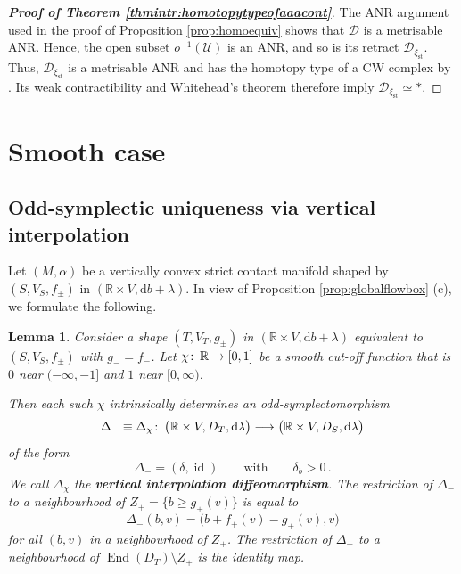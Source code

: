 \documentclass{amsart}
\newtheorem{lem}[prop]{Lemma}
\theoremstyle{definition}
\def\co{\colon\thinspace}
\newcommand{\rmd}{\mathrm d}
\newcommand{\DD}{\mathcal D}
\newcommand{\R}{\mathbb R}
\newcommand{\UU}{\mathcal U}
\newcommand{\lra}{\longrightarrow}
\newcommand{\ra}{\rightarrow}
\DeclareMathOperator{\End}{\mathrm{End}}
\DeclareMathOperator{\id}{\mathrm{id}}
\DeclareMathOperator{\st}{\mathrm{st}}
\begin{document}
\begin{proof}[{\bf Proof of Theorem
\ref{thmintr:homotopytypeofaaacont}}]
The ANR argument used in the proof of
Proposition \ref{prop:homoequiv}
shows that $\DD$ is a metrisable ANR.
Hence, the open subset $o^{-1}(\UU)$ is an ANR,
and so is its retract $\DD_{\xi_{\st}}$.
Thus, $\DD_{\xi_{\st}}$ is a metrisable ANR
and has the homotopy type of a CW complex
by \cite[Theorem~2]{mi59}.
Its weak contractibility and Whitehead's theorem
therefore imply $\DD_{\xi_{\st}}\simeq*$.
\end{proof}




\section{Smooth case}
\label{sec:smoothcase}



\subsection{Odd-symplectic uniqueness
via vertical interpolation\label{subsec:oddsympuniness}}
Let $(M,\alpha)$ be a vertically convex
strict contact manifold
shaped by $(S,V_S,f_{\pm})$
in $(\R\times V,\rmd b+\lambda)$.
In view of Proposition \ref{prop:globalflowbox} (c),
we formulate the following.


\begin{lem}
\label{lem:verticallydiffeomorphic}
Consider a shape $(T,V_T,g_{\pm})$
in $(\R\times V,\rmd b+\lambda)$
equivalent to $(S,V_S,f_{\pm})$
with $g_-=f_-$.
Let $\chi\co\R\ra[0,1]$ be a smooth cut-off function
that is $0$ near $(-\infty,-1]$ and $1$ near $[0,\infty)$.

Then each such $\chi$ intrinsically determines
an odd-symplectomorphism
\[
\Delta_-\equiv
\Delta_{\chi}
\co
\big(\R\times V,D_T,\rmd\lambda\big)
\lra
\big(\R\times V,D_S,\rmd\lambda\big)
\]
of the form
\[
\Delta_-=(\delta,\id)
\qquad\text{with}\qquad
\delta_b>0
\,.
\]
We call $\Delta_\chi$ the
{\bf vertical interpolation diffeomorphism}.
The restriction of $\Delta_-$
to a neighbourhood of $Z_+=\{b\geq g_+(v)\}$
is equal to
 \[
   \Delta_-(b,v)=\Big(b+f_+(v)-g_+(v),v\Big)
 \]
for all $(b,v)$ in a neighbourhood of $Z_+$.
The restriction of $\Delta_-$ to a neighbourhood of
$\End(D_T)\setminus Z_+$ is the identity map.
\end{lem}
\end{document}
